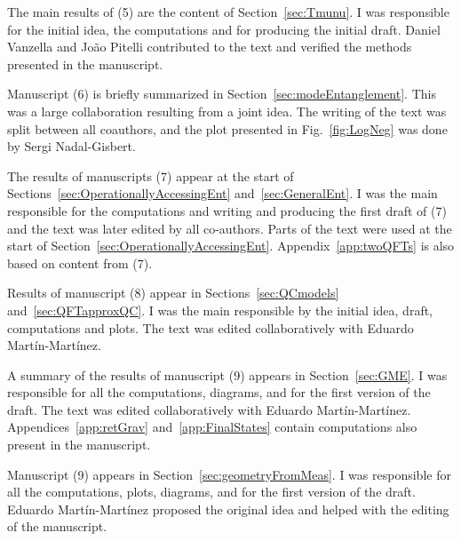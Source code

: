 \documentclass[letterpaper,12pt,titlepage,oneside,final]{book}
\begin{document}
The main results of (5) are the content of Section~\ref{sec:Tmunu}. I was responsible for the initial idea, the computations and for producing the initial draft. Daniel Vanzella and Jo\~ao Pitelli contributed to the text and verified the methods presented in the manuscript.

Manuscript (6) is briefly summarized in Section~\ref{sec:modeEntanglement}. This was a large collaboration resulting from a joint idea. The writing of the text was split between all coauthors, and the plot presented in Fig.~\ref{fig:LogNeg} was done by Sergi Nadal-Gisbert.

The results of manuscripts (7) appear at the start of Sections~\ref{sec:OperationallyAccessingEnt} and~\ref{sec:GeneralEnt}. I was the main responsible for the computations and writing and producing the first draft of (7) and the text was later edited by all co-authors. Parts of the text were used at the start of Section~\ref{sec:OperationallyAccessingEnt}. Appendix~\ref{app:twoQFTs} is also based on content from (7).

Results of manuscript (8) appear in Sections~\ref{sec:QCmodels} and~\ref{sec:QFTapproxQC}. I was the main responsible by the initial idea, draft, computations and plots. The text was edited collaboratively with Eduardo Mart\'in-Mart\'inez. 

A summary of the results of manuscript (9) appears in Section~\ref{sec:GME}. I was responsible for all the computations, diagrams, and for the first version of the draft. The text was edited collaboratively with Eduardo Mart\'in-Mart\'inez. Appendices~\ref{app:retGrav} and~\ref{app:FinalStates} contain computations also present in the manuscript. 

Manuscript (9) appears in Section~\ref{sec:geometryFromMeas}. I was responsible for all the computations, plots, diagrams, and for the first version of the draft. Eduardo Mart\'in-Mart\'inez proposed the original idea and helped with the editing of the manuscript.
\end{document}
